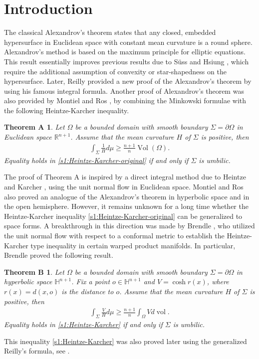 \documentclass[11pt,reqno]{amsart}
\newtheorem*{thmA}{Theorem A}
\newtheorem*{thmB}{Theorem B}
\theoremstyle{definition}
\theoremstyle{remark}
\numberwithin{equation}{section}
\renewcommand{\(}{\left(}
\renewcommand{\)}{\right)}
\renewcommand{\~}{\widetilde}
\renewcommand{\-}{\overline}
\newcommand{\vol}{\operatorname{vol}}
\newcommand{\Vol}{\operatorname{Vol}}
\begin{document}
\section{Introduction}\label{sec:1}
The classical Alexandrov's theorem \cite{Alexandrov1956} states that any closed, embedded hypersurface in Euclidean space with constant mean curvature is a round sphere. Alexandrov's method is based on the maximum principle for elliptic equations. This result essentially improves previous results due to S\"uss \cite{Suss1952} and Hsiung \cite{Hsiung1954}, which require the additional assumption of convexity or star-shapedness on the hypersurface. Later, Reilly \cite{Reilly1977} provided a new proof of the Alexandrov's theorem by using his famous integral formula. Another proof of Alexandrov's theorem was also provided by Montiel and Ros \cite{Montiel-Ros1991}, by combining the Minkowski formulae with the following Heintze-Karcher inequality.
\begin{thmA}
	Let $\Omega$ be a bounded domain with smooth boundary $\Sigma=\partial \Omega$ in Euclidean space $\mathbb R^{n+1}$. Assume that the mean curvature $H$ of $\Sigma$ is positive, then
	\begin{align}\label{s1:Heintze-Karcher-original}
	\int_{\Sigma} \frac{1}{H} d\mu  \geq \frac{n+1}{n}\Vol(\Omega).
	\end{align}
	Equality holds in \eqref{s1:Heintze-Karcher-original} if and only if $\Sigma$ is umbilic.
\end{thmA}
The proof of Theorem A is inspired by a direct integral method due to Heintze and Karcher \cite{Heintze-Karcher1978}, using the unit normal flow in Euclidean space. Montiel and Ros \cite{Montiel-Ros1991} also proved an analogue of the Alexandrov's theorem in hyperbolic space and in the open hemisphere. However, it remains unknown for a long time whether the Heintze-Karcher inequality \eqref{s1:Heintze-Karcher-original} can be generalized to space forms. A breakthrough in this direction was made by Brendle \cite{Bre13}, who utilized the unit normal flow with respect to a conformal metric to establish the Heintze-Karcher type inequality in certain warped product manifolds. In particular, Brendle proved the following result.
\begin{thmB}\cite{Bre13}
	Let $\Omega$ be a bounded domain with smooth boundary $\Sigma=\partial \Omega$ in hyperbolic space $\mathbb H^{n+1}$. Fix a point $o\in \mathbb H^{n+1}$ and $V=\cosh r(x)$, where $r(x)=d(x,o)$ is the distance to $o$. Assume that the mean curvature $H$ of $\Sigma$ is positive, then
	\begin{align}\label{s1:Heintze-Karcher}
	\int_{\Sigma} \frac{V}{H} d\mu  \geq \frac{n+1}{n}\int_{\Omega} V d\vol.
	\end{align}
	Equality holds in \eqref{s1:Heintze-Karcher} if and only if $\Sigma$ is umbilic.
\end{thmB}
This inequality \eqref{s1:Heintze-Karcher} was also proved later using the generalized Reilly's formula, see \cite{Qiu-Xia2015,Li-Xia2019}.
\end{document}
